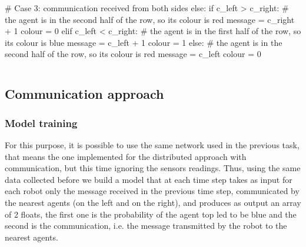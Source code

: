 \begin{python}
	# Case 3: communication received from both sides
	else:
		if c_left > c_right:
			# the agent is in the second half of the row, so its colour is red
			message = c_right + 1
			colour = 0
		elif c_left < c_right:
			# the agent is in the first half of the row, so its colour is blue
			message = c_left + 1
			colour = 1
		else:
			# the agent is in the second half of the row, so its colour is red
			message = c_left
			colour = 0
\end{python}

\begin{lstlisting}[frame=none,caption=Protocol used from the manual controller 
to decide for each robot the message to transmit and the colour., 
label=lst:manualtask2]
\end{lstlisting}


\subsection{Communication approach}
\label{subsec:task2comm}

\subsubsection{Model training}
\label{subsubsec:learnedcomm2}
For this purpose, it is possible to use the same network used in the previous task, 
that means the one implemented for the distributed approach with 
communication, but this time ignoring the sensors readings.
Thus, using the same data collected before we build a model that at each time 
step takes as input for each robot only the message received in the previous time 
step, communicated by the nearest agents (on the left and on the right), and 
produces as output an array of 2 floats, the first one is the probability of the agent 
top \gls{led} to be blue and the second is the communication, i.e. the message 
transmitted by the robot to the nearest agents.

